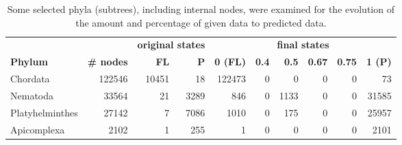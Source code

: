 
      \begin{table}[h!]
        \begin{center}
          \begin{tabular}{ |l|r||r|r||r|r|r|r|r|r| }
            \hline
            & & \multicolumn{2}{c||}{\bfseries original states} & \multicolumn{6}{c|}{\bfseries final states} \\
            \bfseries Phylum & \bfseries \# nodes & \bfseries FL & \bfseries P
              & \bfseries 0 (FL) & \bfseries 0.4 & \bfseries 0.5 & \bfseries 0.67 & \bfseries 0.75 & \bfseries 1 (P) \\
            \hline \hline
            Chordata & 122546 & 10451 & 18 
              & 122473 & 0 & 0 & 0 & 0 & 73 \\
            Nematoda & 33564 & 21 & 3289 
              & 846 & 0 & 1133 & 0 & 0 & 31585 \\
            Platyhelminthes & 27142 & 7 & 7086 
              & 1010 & 0 & 175 & 0 & 0 & 25957 \\
            Apicomplexa & 2102 & 1 & 255 
              & 1 & 0 & 0 & 0 & 0 & 2101 \\
            \hline
          \end{tabular}
        \end{center}
        \caption{Some selected phyla (subtrees), including internal nodes, were examined for the evolution 
        of the amount and percentage of given data to predicted data.}
        \label{table:Phylum internal nodes}
      \end{table}

